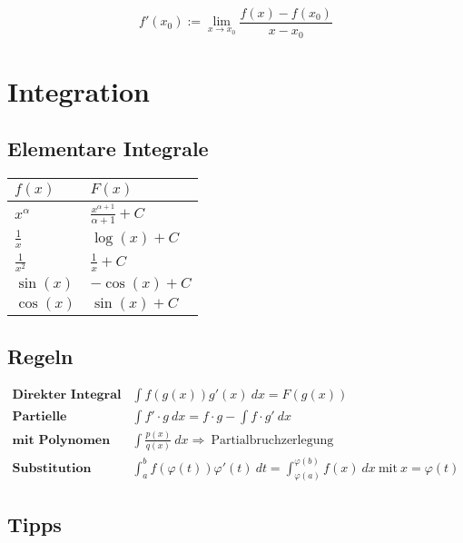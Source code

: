 \documentclass[11pt]{article}
\begin{document}
\begin{equation*}
	f'(x_0) := \lim_{x\to x_0}\frac{f(x) - f(x_0)}{x-x_0}
\end{equation*}

\section{Integration}

\subsection{Elementare Integrale}

\begin{table}[H]
\centering
\begin{tabular}{|l|l|}
\hline
$f(x)$ & $F(x)$ \\ \hline
$x^\alpha$ & $\frac{x^{\alpha+1}}{\alpha+1} + C$ \\ \hline
$\frac{1}{x}$ & $\log (x) + C$ \\ \hline
$\frac{1}{x^2}$ & $\frac{1}{x} + C$ \\ \hline
$\sin(x)$ & $-\cos(x) + C$ \\ \hline
$\cos(x)$ & $\sin(x) + C$ \\ \hline
\end{tabular}
\end{table}

\subsection{Regeln}

\begin{equation*}
\begin{split}
	\textbf{Direkter Integral}\quad & \int f(g(x))g'(x)\ dx = F(g(x)) \\
	\textbf{Partielle Integration}\quad & \int f' \cdot g\ dx = f \cdot g - \int f \cdot g'\ dx \\
	\textbf{mit Polynomen}\quad & \int\frac{p(x)}{q(x)}\ dx \Rightarrow\ \text{Partialbruchzerlegung} \\
	\textbf{Substitution}\quad & \int_a^b f(\varphi(t))\varphi'(t)\ dt = \int_{\varphi(a)}^{\varphi(b)} f(x)\ dx\ \text{mit}\ x = \varphi(t)
\end{split}
\end{equation*}

\subsection{Tipps}
\end{document}
